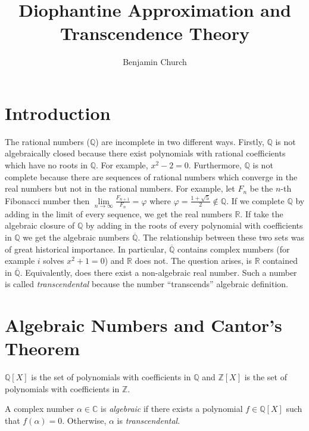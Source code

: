 \documentclass{article}
\newcommand{\Z}{\mathbb{Z}}
\newcommand{\C}{\mathbb{C}}
\newcommand{\Q}{\mathbb{Q}}
\newcommand{\R}{\mathbb{R}}
\newenvironment{definition}[1][Definition:]{\begin{trivlist}
\item[\hskip \labelsep {\bfseries #1}]}{\end{trivlist}}
\theoremstyle{theorem}
\theoremstyle{definition}
\theoremstyle{definition}
\theoremstyle{remark}
\theoremstyle{definition}
\theoremstyle{remark}
\begin{document}
\author{Benjamin Church}
\title{\Huge Diophantine Approximation and Transcendence Theory}

\maketitle
\tableofcontents
\newpage


\section{Introduction}

The rational numbers ($\Q$) are incomplete in two different ways. Firstly, $\Q$ is not algebraically closed because there exist polynomials with rational coefficients which have no roots in $\Q$. For example, $x^2 - 2 = 0$. Furthermore, $\Q$ is not complete because there are sequences of rational numbers which converge in the real numbers but not in the rational numbers. For example, let $F_n$ be the $n$-th Fibonacci number then $\lim\limits_{n \to \infty} \frac{F_{n+1}}{F_n} = \varphi$ where $\varphi = \frac{1 + \sqrt{5}}{2} \notin \Q$. If we complete $\Q$ by adding in the limit of every sequence, we get the real numbers $\R$. If take the algebraic closure of $\Q$ by adding in the roots of every polynomial with coefficients in $\Q$ we get the algebraic numbers $\overline{\Q}$. The relationship between these two sets was of great historical importance. In particular, $\overline{\Q}$ contains complex numbers (for example $i$ solves $x^2 + 1 = 0$) and $\R$ does not. The question arises, is $\R$ contained in $\overline{\Q}$. Equivalently, does there exist a non-algebraic real number. Such a number is called \textit{transcendental} because the number ``transcends'' algebraic definition.  

\section{Algebraic Numbers and Cantor's Theorem}

\begin{definition}
$\Q[X]$ is the set of polynomials with coefficients in $\Q$ and $\Z[X]$ is the set of polynomials with coefficients in $\Z$.  
\end{definition}

\begin{definition}
A complex number $\alpha \in \C$ is \textit{algebraic} if there exists a polynomial $f \in \Q[X]$ such that $f(\alpha) = 0$. Otherwise, $\alpha$ is \textit{transcendental}. 
\end{definition}
\end{document}
